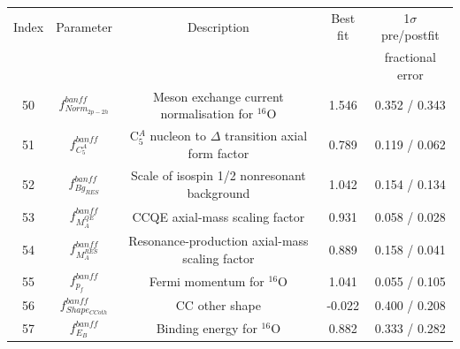 {%

\begin{table}
\centering
\begin{tabular}{| c | c | c | c | c |}
\hline
  Index & Parameter                                                   & Description                                                    & Best fit & 1$\sigma$ pre/postfit \\
        &                                                             &                                                                &          & fractional error \\
\hline

50      &  $f_{Norm_{2p-2h}}^{banff}$                                & Meson exchange current normalisation for $^{16}$O           & 1.546   & 0.352 / 0.343 \\   
51      &  $f_{C^{A}_{5}}^{banff}$                                   & C$^{A}_{5}$ nucleon to $\Delta$ transition axial form factor& 0.789   & 0.119 / 0.062 \\   
52      &  $f_{Bg_{RES}}^{banff}$                                    & Scale of isospin 1/2 nonresonant background                 & 1.042   & 0.154 / 0.134 \\   
53      &  $f_{M_A^{QE}}^{banff}$                                    & CCQE axial-mass scaling factor                              & 0.931   & 0.058 / 0.028 \\   
54      &  $f_{M_A^{RES}}^{banff}$                                   & Resonance-production axial-mass scaling factor              & 0.889   & 0.158 / 0.041 \\   
55      &  $f_{p_{f}}^{banff}$                                       & Fermi momentum for $^{16}$O                                 & 1.041   & 0.055 / 0.105 \\   
56      &  $f_{Shape_{CCoth}}^{banff}$                               & CC other shape                                              & -0.022  & 0.400 / 0.208 \\   
57      &  $f_{E_{B}}^{banff}$                                       & Binding energy for $^{16}$O                                 & 0.882   & 0.333 / 0.282 \\   

\end{tabular}
\end{table}}
